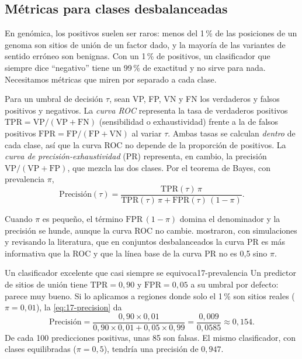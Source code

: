 \subsection{Métricas para clases desbalanceadas}

En genómica, los positivos suelen ser raros: menos del 1\,\% de las posiciones de un genoma son sitios de unión de un factor dado, y la mayoría de las variantes de sentido erróneo son benignas. Con un 1\,\% de positivos, un clasificador que siempre dice ``negativo'' tiene un 99\,\% de exactitud y no sirve para nada. Necesitamos métricas que miren por separado a cada clase.

Para un umbral de decisión $\tau$, sean VP, FP, VN y FN los verdaderos y falsos positivos y negativos. La \emph{curva ROC} representa la tasa de verdaderos positivos $\mathrm{TPR}=\mathrm{VP}/(\mathrm{VP}+\mathrm{FN})$ (sensibilidad o exhaustividad) frente a la de falsos positivos $\mathrm{FPR}=\mathrm{FP}/(\mathrm{FP}+\mathrm{VN})$ al variar $\tau$. Ambas tasas se calculan \emph{dentro} de cada clase, así que la curva ROC no depende de la proporción de positivos. La \emph{curva de precisión-exhaustividad} (PR) representa, en cambio, la precisión $\mathrm{VP}/(\mathrm{VP}+\mathrm{FP})$, que mezcla las dos clases. Por el teorema de Bayes, con prevalencia $\pi$,
\begin{equation}\label{eq:17-precision}
\mathrm{Precisión}(\tau) = \frac{\mathrm{TPR}(\tau)\,\pi}{\mathrm{TPR}(\tau)\,\pi + \mathrm{FPR}(\tau)\,(1-\pi)}.
\end{equation}

\begin{simbolos}
\end{simbolos}

Cuando $\pi$ es pequeño, el término $\mathrm{FPR}\,(1-\pi)$ domina el denominador y la precisión se hunde, aunque la curva ROC no cambie. \textcite{c17-saito2015} mostraron, con simulaciones y revisando la literatura, que en conjuntos desbalanceados la curva PR es más informativa que la ROC y que la línea base de la curva PR no es 0,5 sino $\pi$.

\begin{ejemplo}{Un clasificador excelente que casi siempre se equivoca}{17-prevalencia}
Un predictor de sitios de unión tiene $\mathrm{TPR}=0{,}90$ y $\mathrm{FPR}=0{,}05$ a su umbral por defecto: parece muy bueno. Si lo aplicamos a regiones donde solo el 1\,\% son sitios reales ($\pi=0{,}01$), la \cref{eq:17-precision} da
\[
\text{Precisión}=\frac{0{,}90\times0{,}01}{0{,}90\times0{,}01+0{,}05\times0{,}99}=\frac{0{,}009}{0{,}0585}\approx0{,}154.
\]
De cada 100 predicciones positivas, unas 85 son falsas. El mismo clasificador, con clases equilibradas ($\pi=0{,}5$), tendría una precisión de $0{,}947$.
\end{ejemplo}

